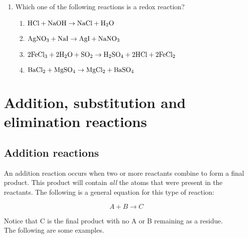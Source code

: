 {\begin{enumerate}
\item{Which one of the following reactions is a redox reaction?}
	\begin{enumerate}
	\item{$\rm{HCl + NaOH \rightarrow NaCl + H_{2}O}$}
	\item{$\rm{AgNO_{3} + NaI \rightarrow AgI + NaNO_{3}}$}
	\item{$\rm{2FeCl_{3} + 2H_{2}O + SO_{2} \rightarrow H_{2}SO_{4} + 2HCl + 2FeCl_{2}}$}
	\item{$\rm{BaCl_{2} + MgSO_{4} \rightarrow MgCl_{2} + BaSO_{4}}$}
	\end{enumerate}

\end{enumerate}
\practiceinfo
}






\section{Addition, substitution and elimination reactions}

\subsection{Addition reactions}

An addition reaction occurs when two or more reactants combine to form a final product. This product will contain \textit{all} the atoms that were present in the reactants. The following is a general equation for this type of reaction:

\begin{equation*}
A + B \rightarrow C
\end{equation*}

Notice that C is the final product with no A or B remaining as a residue.\\

The following are some examples.

